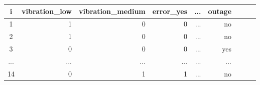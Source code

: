 \begin{tabular}{crrrrrrrr}
\toprule
   i & vibration\_low & vibration\_medium & error\_yes &  ... & outage \\
\midrule
   1 &             1 &                0 &         0 &  ... &     no \\
   2 &             1 &                0 &         0 &  ... &     no \\
   3 &             0 &                0 &         0 &  ... &    yes \\
 ... &           ... &              ... &       ... &  ... &    ... \\
  14 &             0 &                1 &         1 &  ... &     no \\
\bottomrule
\end{tabular}
